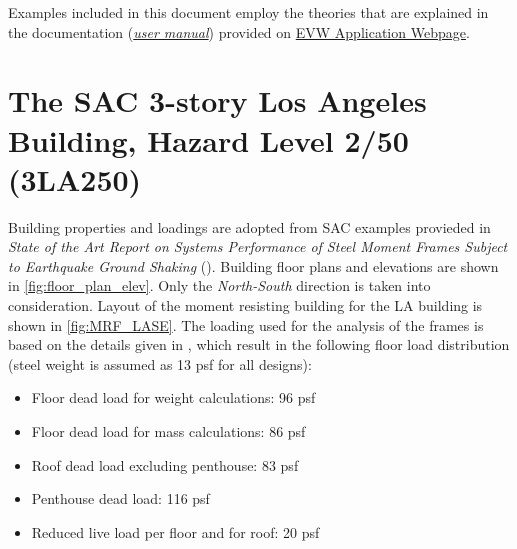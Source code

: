 \documentclass[onecolumn, fleqn]{article}
\title{\bigsf{EVW Tool Examples}}
\date{}
\newcommand{\kips}{\ensuremath{\,\mathrm{kips}}}
\begin{document}
\maketitle
{}

\newpage

\graphicspath{{figures/}{}}

Examples included in this document employ the theories that are explained in the documentation (\href{https://simcenter.designsafe-ci.org/media/filer_public/a0/68/a068ba45-6a47-46f4-83b1-fae585d8ccbe/evw_documentation.pdf}{\textit{user manual}}) provided on \href{https://simcenter.designsafe-ci.org/learning-tools/evw-application/}{EVW Application Webpage}.

\renewcommand{\thesection}{Example \arabic{section}:}
\renewcommand{\thesubsection}{Example \arabic{subsection}:}

\section{The SAC 3-story Los Angeles Building, Hazard Level 2/50 (3LA250)}
Building properties and loadings are adopted from SAC examples provieded in \textit{State of the Art Report on Systems Performance of Steel Moment Frames Subject to Earthquake Ground Shaking} (\citet{FEMA335c2000}). Building floor plans and elevations are shown in \cref{fig:floor_plan_elev}. Only the \textsl{North-South} direction is taken into consideration. Layout of the moment resisting building for the LA building is shown in \cref{fig:MRF_LASE}.
The loading used for the analysis of the frames is based on the details given in \citet{FEMA335c2000}, which result in the following floor load distribution (steel weight is assumed as 13 psf for all designs):

\begin{itemize}
\item[] Floor dead load for weight calculations: 96 psf
\item[] Floor dead load for mass calculations:  86 psf
\item[] Roof dead load excluding penthouse:  83 psf
\item[] Penthouse dead load:  116 psf
\item[] Reduced live load per floor and for roof: 20 psf
\end{itemize}

%
\end{document}
